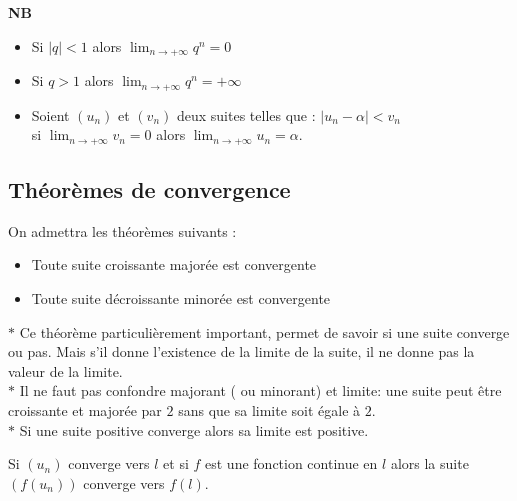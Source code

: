  \textbf{NB}
 \begin{itemize}
 \item Si $ |q|<1 $  alors $ \displaystyle \lim_{n \to  +\infty} q^{n}= 0 $
 \item Si $ q>1 $  alors $ \displaystyle \lim_{n \to  +\infty} q^{n}= +\infty $
 \item Soient $(u_{n})$ et $(v_{n})$ deux suites telles que : $ |u_{n}-\alpha|< v_{n}$  \\           si $ \displaystyle \lim_{n \to  +\infty}v_{n} = 0 $ alors $ \displaystyle \lim_{n \to  +\infty}u_{n} = \alpha .$ 
 \end{itemize}
 \subsection*{Théorèmes de convergence}
 On admettra les théorèmes suivants :
 \begin{theorem}
 \begin{itemize}
 \item   Toute suite croissante majorée est convergente \item  Toute suite décroissante minorée est convergente 
 \end{itemize}
 \end{theorem}

 \begin{remark}
 
 $ \ast $ Ce théorème particulièrement important, permet de savoir si une suite converge ou pas. Mais s'il donne l'existence de la limite de la suite, il ne donne pas la valeur de la limite.\\ 
 $ \ast $ Il ne faut pas confondre majorant ( ou minorant) et limite: une suite peut être croissante et majorée par $ 2 $ sans que sa limite soit égale à $ 2. $\\
 $ \ast $ Si une suite positive converge alors sa limite est positive.
 
\end{remark}
 \begin{theorem}
 Si $(u_{n})$ converge vers $ l $ et si $ f $ est une fonction continue en $ l $ alors la suite  $ (f(u_{n})) $ converge vers $ f(l) $.
 \end{theorem}

